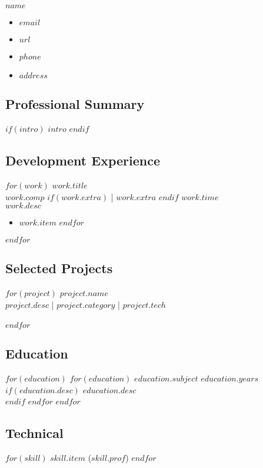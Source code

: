 \documentclass[$fontsize$, letter]{article}
\newcommand{\heading}[1]{
    \hrulefill \vspace{-0.5cm} \subsection*{#1}
}
\begin{document}
\begin{minipage}[t]{0.5\textwidth}
    {\Huge $name$}\\[.2cm]
\end{minipage}
\hfill
\begin{minipage}[b][2cm][b]{0.3\textwidth}
    \begin{itemize}[label={}, align=right]
        \item \hfill $email$
        \item \hfill \href{https://$url$}{$url$}
        \item \hfill $phone$
        \item \hfill $address$
    \end{itemize}
\end{minipage}

\heading{Professional Summary}
$if(intro)$
    \textsc{$intro$}
$endif$

\heading{Development Experience}
$for(work)$
    {\large $work.title$}\\
    {\color{gray}
    $work.comp$
    $if(work.extra)$ \big| $work.extra$ $endif$
    \hspace*{\fill} $work.time$}
    \\
    $work.desc$\\
    \vspace{-\baselineskip}
    \begin{itemize}
    $for(work.item)$
        \item $work.item$
    $endfor$
    \end{itemize}
$endfor$
    
\heading{Selected Projects}
$for(project)$
{\large $project.name$}\\
$project.desc$ \big| $project.category$ \big| $project.tech$\\
\\
$endfor$

\heading{Education}
$for(education)$
    $for(education)$
        {\large $education.subject$}
        \hspace*{\fill} $education.years$\\
        $if(education.desc)$ $education.desc$\\ $endif$
    $endfor$
$endfor$

\heading{Technical}
$for(skill)$
    {$skill.item$ ($skill.prof$)}
$endfor$
\end{document}
